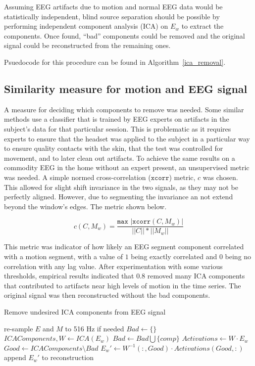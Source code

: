 \documentclass{acm_proc_article-sp}
\begin{document}
Assuming EEG artifacts due to motion and normal EEG data would be
statistically independent, blind source separation should be possible
by performing independent component analysis (ICA) on $E_w$ to extract
the components.  Once found, ``bad'' components could be removed and
the original signal could be reconstructed from the remaining
ones.

Psuedocode for this procedure can be found in Algorithm~\ref{ica_removal}.

\subsection{Similarity measure for motion and EEG signal}

A measure for deciding which components to remove was needed. Some
similar methods use a classifier that is trained by EEG experts on
artifacts in the subject's data for that particular session. This is
problematic as it requires experts to ensure that the headset was
applied to the subject in a particular way to ensure quality contacts
with the skin, that the test was controlled for movement, and to later
clean out artifacts. To achieve the same results on a commodity EEG in
the home without an expert present, an unsupervised metric was
needed. A simple normed cross-correlation ($\texttt{xcorr}$) metric,
$c$ was chosen. This allowed for slight shift invariance in the two
signals, as they may not be perfectly aligned. However, due to
segmenting the invariance an not extend beyond the window's edges. The
metric shown below.

\[ c(C, M_w) = \frac{\texttt{max } |\texttt{xcorr}(C,M_w) |}{||C|| * ||M_w||} \]

This metric was indicator of how likely an EEG segment component
correlated with a motion segment, with a value of $1$ being exactly
correlated and $0$ being no correlation with any lag value. After
experimentation with some various thresholds, empirical results
indicated that $0.8$ removed many ICA components that contributed to
artifacts near high levels of motion in the time series. The original
signal was then reconstructed without the bad components.

\begin{algorithm}
  \caption{Remove undesired ICA components from EEG signal}\label{ica_removal}
  \begin{algorithmic}[1]
    \State re-sample $E$ and $M$ to 516 Hz if needed
    \State $Bad \gets \{\}$
    \State $ICAComponents, W \gets ICA(E_w)$
    \State $Bad \gets Bad \bigcup \{comp\}$
    \EndIf
    \EndFor
    \State $Activations \gets W \cdot E_w$
    \State $Good \gets ICAComponents \setminus Bad$
    \State $E_w' \gets W^{-1}(:,Good) \cdot
    Activations(Good,:)$
    \State append $E_w'$ to reconstruction
    \EndFor
    \EndProcedure
  \end{algorithmic}
\end{algorithm}
\end{document}
